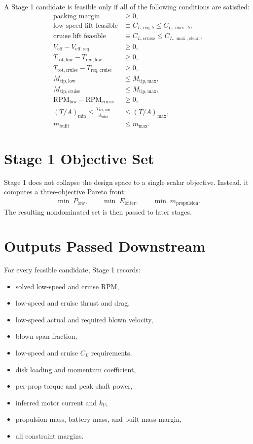 \documentclass[11pt]{article}
\begin{document}
A Stage 1 candidate is feasible only if all of the following conditions are satisfied:
\begin{align}
\text{packing margin} &\ge 0, \\
\text{low-speed lift feasible} &\equiv C_{L,\mathrm{req},b} \le C_{L,\max,b}, \\
\text{cruise lift feasible} &\equiv C_{L,\mathrm{cruise}} \le C_{L,\max,\mathrm{clean}}, \\
V_{\mathrm{eff}} - V_{\mathrm{eff,req}} &\ge 0, \\
T_{\mathrm{tot,low}} - T_{\mathrm{req,low}} &\ge 0, \\
T_{\mathrm{tot,cruise}} - T_{\mathrm{req,cruise}} &\ge 0, \\
M_{\mathrm{tip,low}} &\le M_{\mathrm{tip,max}}, \\
M_{\mathrm{tip,cruise}} &\le M_{\mathrm{tip,max}}, \\
\mathrm{RPM}_{\mathrm{low}} - \mathrm{RPM}_{\mathrm{cruise}} &\ge 0, \\
\left(T/A\right)_{\min} \le \frac{T_{\mathrm{tot,low}}}{A_{\mathrm{disk}}} &\le \left(T/A\right)_{\max}, \\
m_{\mathrm{built}} &\le m_{\max}.
\end{align}

\section{Stage 1 Objective Set}

Stage 1 does not collapse the design space to a single scalar objective. Instead, it computes a three-objective Pareto front:
\begin{align}
\min \; P_{\mathrm{low}}, \qquad
\min \; E_{\mathrm{loiter}}, \qquad
\min \; m_{\mathrm{propulsion}}.
\end{align}
The resulting nondominated set is then passed to later stages.

\section{Outputs Passed Downstream}

For every feasible candidate, Stage 1 records:
\begin{itemize}[leftmargin=1.5em]
\item solved low-speed and cruise RPM,
\item low-speed and cruise thrust and drag,
\item low-speed actual and required blown velocity,
\item blown span fraction,
\item low-speed and cruise \(C_L\) requirements,
\item disk loading and momentum coefficient,
\item per-prop torque and peak shaft power,
\item inferred motor current and \(k_V\),
\item propulsion mass, battery mass, and built-mass margin,
\item all constraint margins.
\end{itemize}
\end{document}
